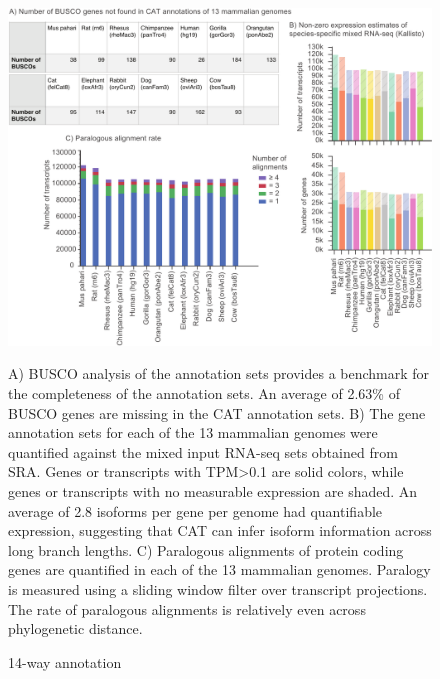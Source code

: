 \documentclass[fleqn,10pt]{wlscirep}
\begin{document}
\begin{figure}
\centering
\includegraphics[width=\textwidth,height=\textheight,keepaspectratio]{13way.pdf}
\caption{14-way annotation}
A) BUSCO analysis of the annotation sets provides a benchmark for the completeness of the annotation sets. An average of 2.63\% of BUSCO genes are missing in the CAT annotation sets. B) The gene annotation sets for each of the 13 mammalian genomes were quantified against the mixed input RNA-seq sets obtained from SRA. Genes or transcripts with TPM\textgreater 0.1 are solid colors, while genes or transcripts with no measurable expression are shaded. An average of 2.8  isoforms per gene per genome had quantifiable expression, suggesting that CAT can infer isoform information across long branch lengths. C) Paralogous alignments of protein coding genes are quantified in each of the 13 mammalian genomes. Paralogy is measured using a sliding window filter over transcript projections. The rate of paralogous alignments is relatively even across phylogenetic distance.
\label{fig:fig4}
\end{figure}
\end{document}

